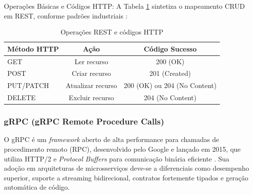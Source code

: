 Operações Básicas e Códigos HTTP:
A Tabela \ref{tab:rest_operations} sintetiza o mapeamento CRUD em REST, conforme padrões industriais \cite{fielding2000rest}:

\begin{table}[h]
\centering
\caption{Operações REST e códigos HTTP}
\label{tab:rest_operations}
\begin{tabular}{|l|c|c|}
\hline
Método HTTP & Ação & Código Sucesso \\ \hline
GET & Ler recurso & 200 (OK) \\ \hline
POST & Criar recurso & 201 (Created) \\ \hline
PUT/PATCH & Atualizar recurso & 200 (OK) ou 204 (No Content) \\ \hline
DELETE & Excluir recurso & 204 (No Content) \\ \hline
\end{tabular}
\end{table}


\subsubsection{gRPC (gRPC Remote Procedure Calls)}

O \gls{gRPC} é um \textit{framework} aberto de alta performance para chamadas de procedimento remoto (RPC), desenvolvido pelo Google e lançado em 2015, que utiliza \gls{HTTP/2} e \textit{Protocol Buffers} para comunicação binária eficiente \cite{niswar2023performance, maso2024comparativo}. Sua adoção em arquiteturas de microsserviços deve-se a diferenciais como desempenho superior, suporte a streaming bidirecional, contratos fortemente tipados e geração automática de código.

